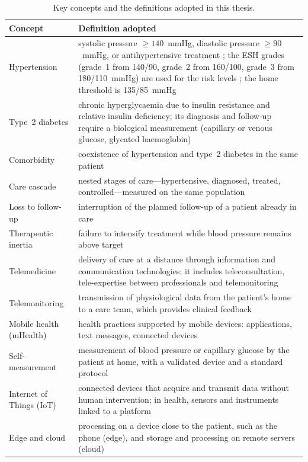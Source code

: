 \documentclass[11pt,a4paper,oneside]{report}
\begin{document}
\begin{table}[htbp]
\centering\footnotesize
\caption{Key concepts and the definitions adopted in this thesis.}\label{tab:concepts}
\begin{tabularx}{\textwidth}{@{}>{\raggedright\arraybackslash}p{3.3cm} X@{}}
\toprule
\textbf{Concept} & \textbf{Definition adopted} \\
\midrule
Hypertension & systolic pressure $\geq 140$~mmHg, diastolic pressure $\geq 90$~mmHg, or antihypertensive treatment \parencite{who2023hypertension}; the ESH grades (grade~1 from 140/90, grade~2 from 160/100, grade~3 from 180/110~mmHg) are used for the risk levels \parencite{mancia2023}; the home threshold is 135/85~mmHg \\
Type~2 diabetes & chronic hyperglycaemia due to insulin resistance and relative insulin deficiency; its diagnosis and follow-up require a biological measurement (capillary or venous glucose, glycated haemoglobin) \\
Comorbidity & coexistence of hypertension and type~2 diabetes in the same patient \\
Care cascade & nested stages of care---hypertensive, diagnosed, treated, controlled---measured on the same population \parencite{who2023hypertension} \\
Loss to follow-up & interruption of the planned follow-up of a patient already in care \\
Therapeutic inertia & failure to intensify treatment while blood pressure remains above target \\
Telemedicine & delivery of care at a distance through information and communication technologies; it includes teleconsultation, tele-expertise between professionals and telemonitoring \\
Telemonitoring & transmission of physiological data from the patient's home to a care team, which provides clinical feedback \\
Mobile health (mHealth) & health practices supported by mobile devices: applications, text messages, connected devices \\
Self-measurement & measurement of blood pressure or capillary glucose by the patient at home, with a validated device and a standard protocol \\
Internet of Things (IoT) & connected devices that acquire and transmit data without human intervention; in health, sensors and instruments linked to a platform \\
Edge and cloud & processing on a device close to the patient, such as the phone (edge), and storage and processing on remote servers (cloud) \\

\end{tabularx}
\end{table}
\end{document}
